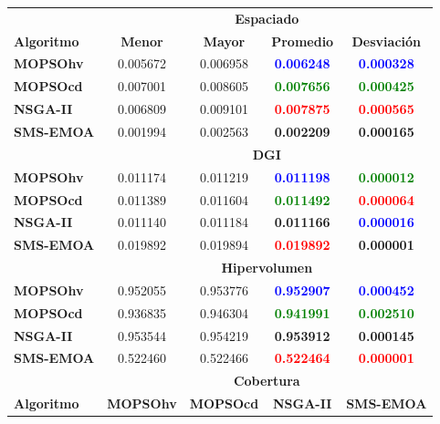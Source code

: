  \begin{table}
 \begin{center}
  \begin{tabular}{|l|cc|cc|} \hline
    & \multicolumn{4}{|c|}{\textbf{Espaciado}} \\ 
	\textbf{Algoritmo} & \textbf{Menor} & \textbf{Mayor} & \textbf{Promedio} & \textbf{Desviaci\'on} \\  \hline\hline
	\textbf{MOPSOhv} &0.005672 & 0.006958 & \textbf{\textcolor{blue}{0.006248}} & \textbf{\textcolor{blue}{0.000328}}  \\ 
	\textbf{MOPSOcd} &0.007001 & 0.008605 & \textbf{\textcolor{green}{0.007656}}& \textbf{\textcolor{green}{0.000425}} \\ 
	\textbf{NSGA-II} &0.006809 & 0.009101 & \textbf{\textcolor{red}{0.007875}}  & \textbf{\textcolor{red}{0.000565}} \\  
	\textbf{SMS-EMOA}&0.001994 & 0.002563 & \textbf{0.002209} & \textbf{0.000165} \\  
	\hline\hline
    & \multicolumn{4}{|c|}{\textbf{DGI}} \\ 	\hline \hline
	\textbf{MOPSOhv} &0.011174 & 0.011219 & \textbf{\textcolor{blue}{0.011198}} & \textbf{\textcolor{green}{0.000012}} \\ 
	\textbf{MOPSOcd} &0.011389 & 0.011604 & \textbf{\textcolor{green}{0.011492}} & \textbf{\textcolor{red}{0.000064}} \\ 
	\textbf{NSGA-II} &0.011140 & 0.011184 & \textbf{0.011166} & \textbf{\textcolor{blue}{\textbf{0.000016}}} \\  
	\textbf{SMS-EMOA}&0.019892 & 0.019894 & \textbf{\textcolor{red}{0.019892}} & \textbf{0.000001} \\  
	\hline\hline
    & \multicolumn{4}{|c|}{\textbf{Hipervolumen}} \\ \hline \hline
	\textbf{MOPSOhv} &0.952055 & 0.953776 &\textbf{\textcolor{blue}{ 0.952907}} &\textbf{\textcolor{blue}{ 0.000452}}  \\ 
	\textbf{MOPSOcd} &0.936835 & 0.946304 &\textbf{\textcolor{green}{ 0.941991}} &\textbf{\textcolor{green}{ 0.002510}} \\ 
	\textbf{NSGA-II} &0.953544 & 0.954219 & \textbf{0.953912} & \textbf{0.000145}  \\  
	\textbf{SMS-EMOA}&0.522460 & 0.522466 &\textbf{\textcolor{red}{ 0.522464}} & \textbf{\textcolor{red}{0.000001}}  \\  
	\hline
    & \multicolumn{4}{|c|}{\textbf{Cobertura}} \\ \hline\hline 
	\textbf{Algoritmo} & \textbf{MOPSOhv} & \textbf{MOPSOcd} & \textbf{NSGA-II} & \textbf{SMS-EMOA} \\  \hline \hline

\end{tabular}
\end{center}
\end{table}
